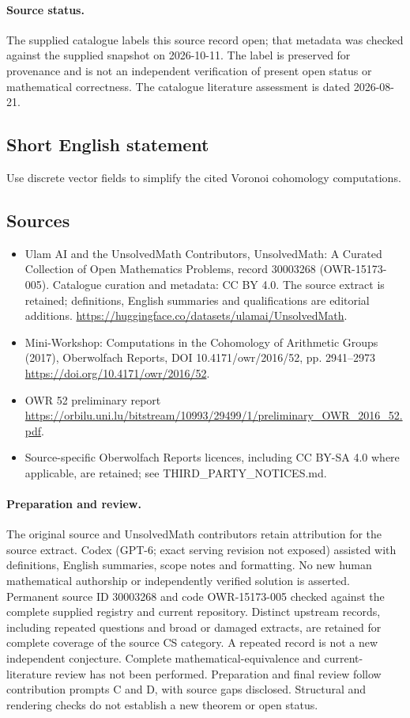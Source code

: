 \documentclass[11pt]{article}
\begin{document}
\paragraph{Source status.}
The supplied catalogue labels this source record open; that metadata was checked against the supplied snapshot on 2026-10-11. The label is preserved for provenance and is not an independent verification of present open status or mathematical correctness. The catalogue literature assessment is dated 2026-08-21.
\subsection{Short English statement}
Use discrete vector fields to simplify the cited Voronoi cohomology computations.
\subsection{Sources}
\begin{itemize}
\item[S1] Ulam AI and the UnsolvedMath Contributors, UnsolvedMath: A Curated Collection of Open Mathematics Problems, record 30003268 (OWR-15173-005). Catalogue curation and metadata: CC BY 4.0. The source extract is retained; definitions, English summaries and qualifications are editorial additions.
\url{https://huggingface.co/datasets/ulamai/UnsolvedMath}.
\item[S2] Mini-Workshop: Computations in the Cohomology of Arithmetic Groups (2017), Oberwolfach Reports, DOI 10.4171/owr/2016/52, pp. 2941--2973
\url{https://doi.org/10.4171/owr/2016/52}.
\item[S3] OWR 52 preliminary report
\url{https://orbilu.uni.lu/bitstream/10993/29499/1/preliminary_OWR_2016_52.pdf}.
\item Source-specific Oberwolfach Reports licences, including CC BY-SA 4.0 where applicable, are retained; see THIRD\_PARTY\_NOTICES.md.
\end{itemize}
\paragraph{Preparation and review.}
The original source and UnsolvedMath contributors retain attribution for the source extract. Codex (GPT-6; exact serving revision not exposed) assisted with definitions, English summaries, scope notes and formatting. No new human mathematical authorship or independently verified solution is asserted. Permanent source ID 30003268 and code OWR-15173-005 checked against the complete supplied registry and current repository. Distinct upstream records, including repeated questions and broad or damaged extracts, are retained for complete coverage of the source CS category. A repeated record is not a new independent conjecture. Complete mathematical-equivalence and current-literature review has not been performed. Preparation and final review follow contribution prompts C and D, with source gaps disclosed. Structural and rendering checks do not establish a new theorem or open status.
\label{end:30003268}
\end{document}
